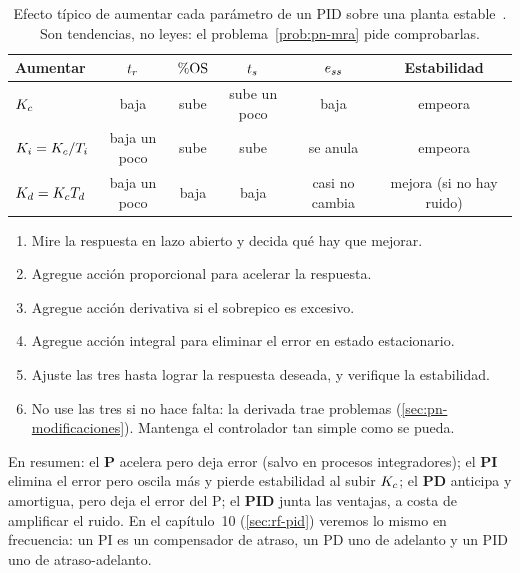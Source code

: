 
\begin{table}[ht]
\centering
\caption{Efecto típico de aumentar cada parámetro de un PID sobre una planta estable~\citep{ACL05}. Son tendencias, no leyes: el problema~\ref{prob:pn-mra} pide comprobarlas.}
\label{tab:pn-efectos}
\small
\begin{tabular}{@{}lccccc@{}}
\toprule
Aumentar & $t_r$ & $\%\mathrm{OS}$ & $t_s$ & $e_{ss}$ & Estabilidad\\
\midrule
$K_c$ & baja & sube & sube un poco & baja & empeora\\
$K_i=K_c/T_i$ & baja un poco & sube & sube & se anula & empeora\\
$K_d=K_cT_d$ & baja un poco & baja & baja & casi no cambia & mejora (si no hay ruido)\\
\bottomrule
\end{tabular}
\end{table}

\begin{receta}
\begin{enumerate}
  \item Mire la respuesta en lazo abierto y decida qué hay que mejorar.
  \item Agregue acción proporcional para acelerar la respuesta.
  \item Agregue acción derivativa si el sobrepico es excesivo.
  \item Agregue acción integral para eliminar el error en estado estacionario.
  \item Ajuste las tres hasta lograr la respuesta deseada, y verifique la estabilidad.
  \item No use las tres si no hace falta: la derivada trae problemas (\cref{sec:pn-modificaciones}). Mantenga el controlador tan simple como se pueda.
\end{enumerate}
\end{receta}

En resumen: el \textbf{P} acelera pero deja error (salvo en procesos integradores); el \textbf{PI} elimina el error pero oscila más y pierde estabilidad al subir $K_c$; el \textbf{PD} anticipa y amortigua, pero deja el error del P; el \textbf{PID} junta las ventajas, a costa de amplificar el ruido. En el capítulo~10 (\cref{sec:rf-pid}) veremos lo mismo en frecuencia: un PI es un compensador de atraso, un PD uno de adelanto y un PID uno de atraso-adelanto.
